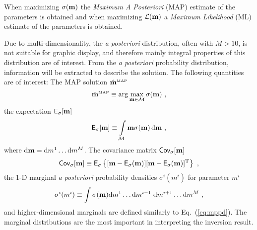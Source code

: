 \documentclass{saclantc}
\newcommand{\MAP}[1]{\hat{#1}^{\mbox{\tiny\rm MAP}}}
\newcommand{\E}{{\sf E}}
\begin{document}
When maximizing  $  \sigma({\bf m}) $  the {\it Maximum A Posteriori} (MAP)
estimate of the parameters is obtained and when maximizing  
${\cal L}({\bf m})$  a {\it Maximum Likelihood} (ML) estimate of the
parameters is obtained.

Due to  multi-dimensionality, the {\it a posteriori} distribution, 
often with $ M > 10$, is not suitable for graphic display, 
and therefore mainly integral properties of this distribution are of interest.
From the {\it a posteriori\/} probability distribution, 
 information will be extracted to describe the solution. 
The following quantities are of interest:
The MAP solution $\MAP{\bf m}$
\begin{equation}
 \MAP{\bf m}  \equiv \arg\max\limits_{{\bf m} \in {\cal M}} \sigma ({\bf m} )~,
 \label{eq:map}
\end{equation}
the expectation $\E_\sigma[{\bf m}]$
\begin{equation}
 \E_\sigma [{\bf m}] \equiv\int\limits_{\cal M} {\bf m} \sigma ({\bf m})\, 
 {\rm d} {\bf m}~, 
 \label{eq:mean}
\end{equation}
where ${\rm d}{\bf m}  = {\rm d} m^1 \ldots {\rm d}m^M$.
The covariance matrix $\mbox{\sf Cov}_\sigma[{\bf m}]$
\begin{equation}
 {\sf Cov}_\sigma [{\bf m}] \equiv  \E_\sigma
 \left\{  [{\bf m} - \mbox\E_\sigma ({\bf m})] 
          [{\bf m} - \mbox\E_\sigma ({\bf m})]^{\rm T} 
 \right\}~,
 \label{eq:cov}
\end{equation}
the 1-D marginal {\it a posteriori} probability densities  $ \sigma^i (m^i)$ 
for parameter $m^i$
\begin{equation}
   \sigma^i (m^i) \equiv \int\sigma({\bf m})
  {\rm d}{m^1}     \ldots {\rm d}{m^{i-1}} \; 
  {\rm d}{m^{i+1}} \ldots {\rm d}{m^{M}}~,
\label{eq:mppd}
\end{equation}
and higher-dimensional marginals are defined similarly to
 Eq.~(\ref{eq:mppd}).
The marginal distributions are the most important in interpreting the
inversion result.
\end{document}
